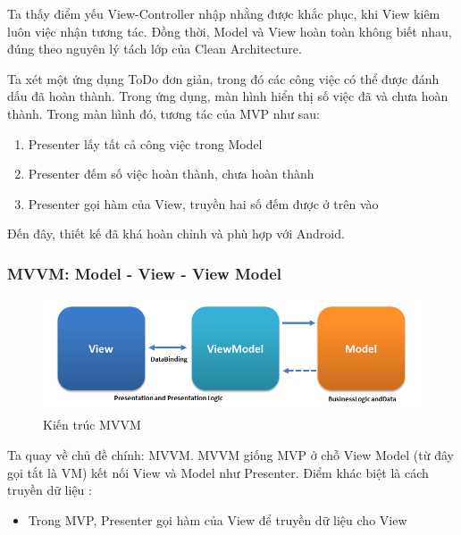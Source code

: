 \documentclass[../../thesis]{subfiles}
\begin{document}
Ta thấy điểm yếu View-Controller nhập nhằng được khắc phục, khi View kiêm luôn
việc nhận tương tác. Đồng thời, Model và View hoàn toàn không biết nhau, đúng
theo nguyên lý tách lớp của Clean Architecture.

Ta xét một ứng dụng ToDo đơn giản, trong đó các công việc có thể được đánh dấu
đã hoàn thành. Trong ứng dụng, màn hình hiển thị số việc đã và chưa hoàn thành.
Trong màn hình đó, tương tác của MVP như sau:

\begin{enumerate}
    \item
        Presenter lấy tất cả công việc trong Model
    \item
        Presenter đếm số việc hoàn thành, chưa hoàn thành
    \item
        Presenter gọi hàm của View, truyền hai số đếm được ở trên vào
\end{enumerate}

Đến đây, thiết kế đã khá hoàn chỉnh và phù hợp với Android.

\subsubsection{MVVM: Model - View - View Model}

\begin{figure}
    \centering
    \vspace*{-6mm}
    \includegraphics[width=\linewidth]{../images/MVVMPattern.png}
    \vspace*{-10mm}
    \caption{Kiến trúc MVVM \cite{MUN_MVVM}}
    \label{fig:mvvm}
\end{figure}

Ta quay về chủ đề chính: MVVM. MVVM giống MVP ở chỗ View Model (từ đây gọi tắt
là VM) kết nối View và Model như Presenter. Điểm khác biệt là cách truyền dữ
liệu \cite{MUN_MVVM}:

\begin{itemize}
    \item
          Trong MVP, Presenter gọi hàm của View để truyền dữ liệu cho View
\end{itemize}
\end{document}
